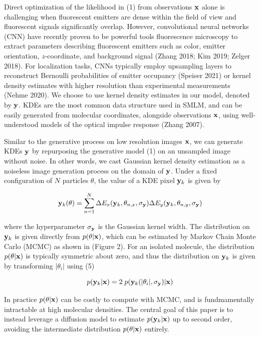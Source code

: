 \documentclass{article}
\begin{document}
Direct optimization of the likelihood in (1) from observations $\bold{x}$ alone is challenging when fluorescent emitters are dense within the field of view and fluorescent signals significantly overlap. However, convolutional neural networks (CNN) have recently proven to be powerful tools fluorescence microscopy to extract parameters describing fluorescent emitters such as color, emitter orientation, $z$-coordinate, and background signal (Zhang 2018; Kim 2019; Zelger 2018). For localization tasks, CNNs typically employ upsampling layers to reconstruct Bernoulli probabilities of emitter occupancy (Speiser 2021) or kernel density estimates with higher resolution than experimental measurements (Nehme 2020). We choose to use kernel density estimates in our model, denoted by $\bold{y}$. KDEs are the most common data structure used in SMLM, and can be easily generated from molecular coordinates, alongside observations $\bold{x}$, using well-understood models of the optical impulse response (Zhang 2007). 

Similar to the generative process on low resolution images $\bold{x}$, we can generate KDEs $\bold{y}$ by repurposing the generative model (1) on an unsampled image without noise. In other words, we cast Gaussian kernel density estimation as a noiseless image generation process on the domain of $\bold{y}$. Under a fixed configuration of $N$ particles $\theta$, the value of a KDE pixel $\bold{y}_{k}$ is given by

\begin{equation}
\bold{y}_{k}(\theta) = \sum_{n=1}^{N}\Delta E_{x}(\bold{y}_{k},\theta_{n,x},\sigma_{\bold{y}}) \Delta E_{y}(\bold{y}_{k},\theta_{n,y},\sigma_{\bold{y}})
\end{equation}

where the hyperparameter $\sigma_{\bold{y}}$ is the Gaussian kernel width. The distribution on $\bold{y}_{k}$ is given directly from $p(\theta|\bold{x})$, which can be estimated by Markov Chain Monte Carlo (MCMC) as shown in (Figure 2). For an isolated molecule, the distribution $p(\theta|\bold{x})$ is typically symmetric about zero, and thus the distribution on $\bold{y}_{k}$ is given by transforming $|\theta_{i}|$ using (5)

\begin{equation}
p(\bold{y}_{k}|\bold{x}) = 2 \; p(\bold{y}_{k}(|\theta_{i}|,\sigma_{\bold{y}})|\bold{x})
\end{equation}

In practice $p(\theta|\bold{x})$ can be costly to compute with MCMC, and is fundmamentally intractable at high molecular densities. The central goal of this paper is to instead leverage a diffusion model to estimate $p(\bold{y}_{k}|\bold{x})$ up to second order, avoiding the intermediate distribution $p(\theta|\bold{x})$ entirely.
\end{document}
